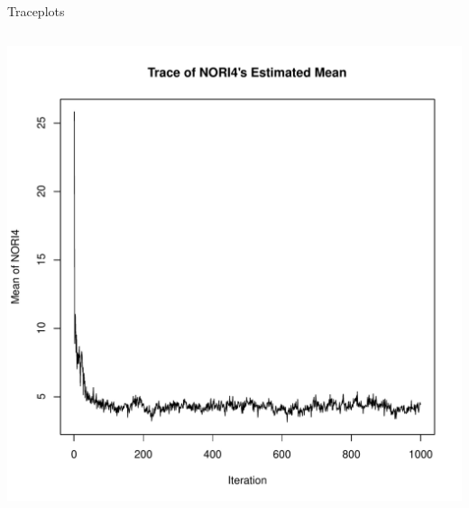 \documentclass{beamer}\usepackage[]{graphicx}\usepackage[]{color}
\newenvironment{knitrout}{}{} %
\begin{document}
\begin{frame}{Traceplots}
\begin{columns}
\begin{column}{0.5\textwidth}
  
\begin{knitrout}\footnotesize
{}\color{fgcolor}

{\centering \includegraphics[width=0.95\linewidth]{figure/unnamed-chunk-2-1} 

}



\end{knitrout}

\end{column}
\end{columns}

\end{frame}

\watermarkon %
\end{document}
